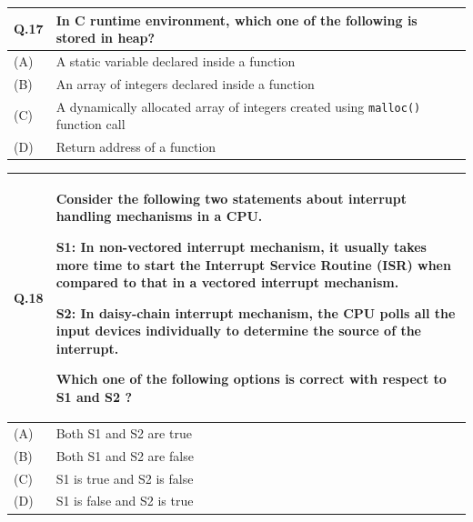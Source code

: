 \documentclass[14pt]{article}
\begin{document}
\vspace{0.8cm}

\begin{tabular}{|p{1.2cm}|p{12cm}|}
\hline

\textbf{Q.17} &
In C runtime environment, which one of the following is stored in heap?
\\

\hline

(A) & A static variable declared inside a function \\
\hline

(B) & An array of integers declared inside a function \\
\hline

(C) & A dynamically allocated array of integers created using \texttt{malloc()} function call \\
\hline

(D) & Return address of a function \\
\hline

\end{tabular}

\vspace{0.8cm}

\begin{tabular}{|p{1.2cm}|p{12cm}|}
\hline

\textbf{Q.18} &
Consider the following two statements about interrupt handling mechanisms in a CPU.

\vspace{0.3cm}

\textbf{S1:} In non-vectored interrupt mechanism, it usually takes more time to start the Interrupt Service Routine (ISR) when compared to that in a vectored interrupt mechanism.

\vspace{0.3cm}

\textbf{S2:} In daisy-chain interrupt mechanism, the CPU polls all the input devices individually to determine the source of the interrupt.

\vspace{0.3cm}

Which one of the following options is correct with respect to S1 and S2 ?
\\

\hline

(A) & Both S1 and S2 are true \\
\hline

(B) & Both S1 and S2 are false \\
\hline

(C) & S1 is true and S2 is false \\
\hline

(D) & S1 is false and S2 is true \\
\hline

\end{tabular}
\end{document}
